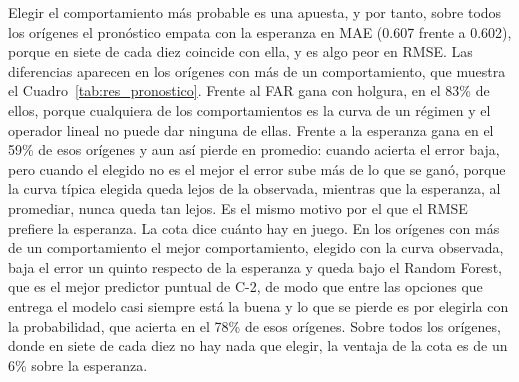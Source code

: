Elegir el comportamiento más probable es una apuesta, y por tanto, sobre todos los orígenes el pronóstico empata con la esperanza en MAE (0.607 frente a 0.602), porque en siete de cada diez coincide con ella, y es algo peor en RMSE. Las diferencias aparecen en los orígenes con más de un comportamiento, que muestra el Cuadro~\ref{tab:res_pronostico}. Frente al FAR gana con holgura, en el 83\% de ellos, porque cualquiera de los comportamientos es la curva de un régimen y el operador lineal no puede dar ninguna de ellas. Frente a la esperanza gana en el 59\% de esos orígenes y aun así pierde en promedio: cuando acierta el error baja, pero cuando el elegido no es el mejor el error sube más de lo que se ganó, porque la curva típica elegida queda lejos de la observada, mientras que la esperanza, al promediar, nunca queda tan lejos. Es el mismo motivo por el que el RMSE prefiere la esperanza. La cota dice cuánto hay en juego. En los orígenes con más de un comportamiento el mejor comportamiento, elegido con la curva observada, baja el error un quinto respecto de la esperanza y queda bajo el Random Forest, que es el mejor predictor puntual de C-2, de modo que entre las opciones que entrega el modelo casi siempre está la buena y lo que se pierde es por elegirla con la probabilidad, que acierta en el 78\% de esos orígenes. Sobre todos los orígenes, donde en siete de cada diez no hay nada que elegir, la ventaja de la cota es de un 6\% sobre la esperanza.

